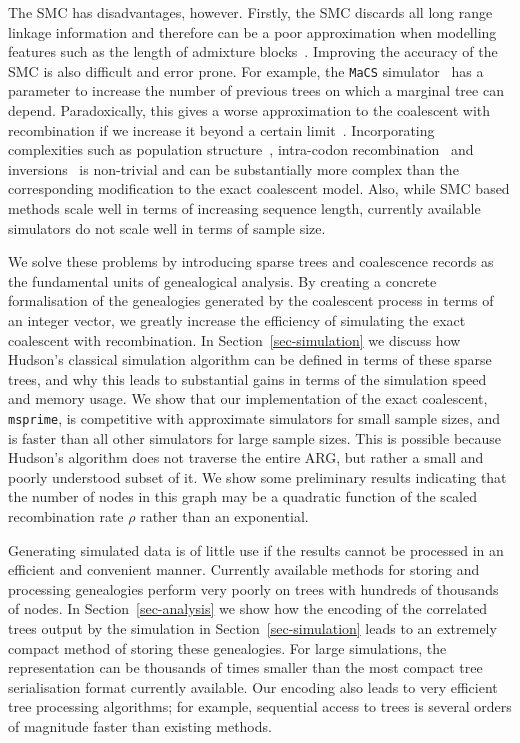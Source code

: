 \documentclass[10pt]{article}
\newcommand{\msprime}[0]{\texttt{msprime}}
\begin{document}
The SMC has disadvantages, however. Firstly, the SMC discards all long range
linkage information and therefore can be a poor approximation when modelling
features such as the length of admixture blocks~\citep{ln14}.  Improving the
accuracy of the SMC is also difficult and error prone. For example, the
\texttt{MaCS} simulator~\citep{cmw09} has a parameter to increase the
number of previous trees on which a marginal tree can depend.
Paradoxically, this gives a worse approximation to the
coalescent with recombination if we increase it beyond a certain
limit~\citep{szml14}.
Incorporating complexities such as population structure~\citep{emm09},
intra-codon recombination~\citep{ap10} and inversions~\citep{pkgk13} is
non-trivial and can be substantially more complex than the corresponding
modification to the exact coalescent model. Also, while SMC based methods scale
well in terms of increasing sequence length, currently available simulators do
not scale well in terms of sample size.

We solve these problems by introducing sparse trees and coalescence records as
the fundamental units of genealogical analysis. By creating a concrete
formalisation of the genealogies generated by the coalescent process in terms
of an integer vector, we greatly increase the efficiency of simulating the
exact coalescent with recombination. In Section~\ref{sec-simulation} we
discuss how Hudson's classical simulation algorithm can be defined in terms of
these sparse trees, and why this leads to substantial gains in terms of the
simulation speed and memory usage. We show that our implementation of the exact
coalescent, \msprime, is competitive with approximate simulators for small
sample sizes, and is faster than all other simulators for large sample sizes.
This is possible because Hudson's algorithm does not traverse the entire ARG,
but rather a small and poorly understood subset of it. We show some preliminary
results indicating that the number of nodes in this graph may be a quadratic
function of the scaled recombination rate $\rho$ rather than an exponential.

Generating simulated data is of little use if the results cannot be processed
in an efficient and convenient manner. Currently available methods for storing
and processing genealogies perform very poorly on trees with hundreds of thousands of
nodes. In Section~\ref{sec-analysis} we show how the encoding of the
correlated trees output by the simulation in Section~\ref{sec-simulation} leads
to an extremely compact method of storing these genealogies. For large
simulations, the representation can be thousands of times smaller than the most
compact tree serialisation format currently available. Our encoding also leads
to very efficient tree processing algorithms; for example, sequential access to
trees is several orders of magnitude faster than existing methods.
\end{document}
